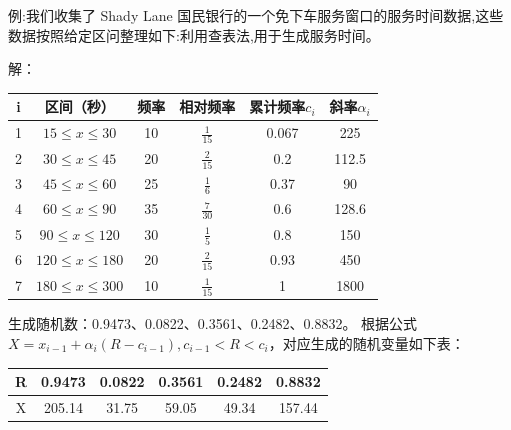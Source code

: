 例:我们收集了 Shady Lane 国民银行的一个免下车服务窗口的服务时间数据,这些数据按照给定区问整理如下:利用查表法,用于生成服务时间。

解：\vspace*{-16pt}
\begin{table}[H]
    \centering
    \begin{tabular}{c|ccccc}
        \hline
        i & 区间（秒）                        & 频率 & 相对频率           & 累计频率$c_{i}$ & 斜率$\alpha_{i}$ \\ \hline
        1 & $15\leqslant x \leqslant30$   & 10 & $\frac{1}{15}$ & 0.067       & 225       \\
        2 & $30\leqslant x \leqslant45$   & 20 & $\frac{2}{15}$ & 0.2         & 112.5     \\
        3 & $45\leqslant x \leqslant60$   & 25 & $\frac{1}{6}$  & 0.37        & 90        \\
        4 & $60\leqslant x \leqslant90$   & 35 & $\frac{7}{30}$ & 0.6         & 128.6     \\
        5 & $90\leqslant x \leqslant120$  & 30 & $\frac{1}{5}$  & 0.8         & 150       \\
        6 & $120\leqslant x \leqslant180$ & 20 & $\frac{2}{15}$ & 0.93        & 450       \\
        7 & $180\leqslant x \leqslant300$ & 10 & $\frac{1}{15}$ & 1           & 1800      \\ \hline
    \end{tabular}
\end{table}
生成随机数：0.9473、0.0822、0.3561、0.2482、0.8832。
根据公式$X=x_{i-1}+\alpha_i(R-c_{i-1}),c_{i-1}<R<c_i$，对应生成的随机变量如下表：
\begin{table}[H]
    \centering
    \begin{tabular}{cccccc}
        \hline
        R & 0.9473 & 0.0822 & 0.3561 & 0.2482 & 0.8832 \\ \hline
        X & 205.14 & 31.75  & 59.05  & 49.34  & 157.44 \\ \hline
    \end{tabular}
\end{table}
